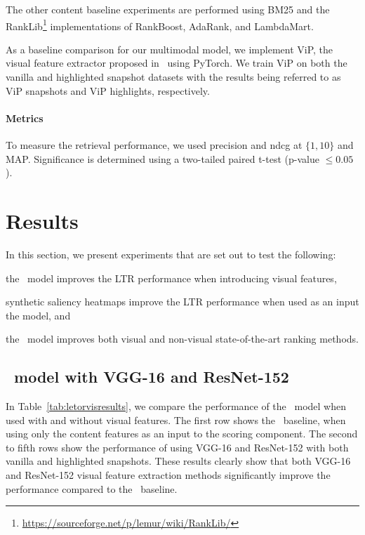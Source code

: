 The other content baseline experiments are performed using BM25 and the RankLib\footnote{\url{https://sourceforge.net/p/lemur/wiki/RankLib/}} implementations of RankBoost, AdaRank, and LambdaMart.

As a baseline comparison for our multimodal model, we implement ViP, the visual feature extractor proposed in~\citet{fan2017learning} using PyTorch. We train ViP on both the vanilla and highlighted snapshot datasets with the results being referred to as ViP snapshots and ViP highlights, respectively.


\paragraph{Metrics}
To measure the retrieval performance, we used precision and ndcg at $\{1,10\}$ and MAP.
Significance is determined using a two-tailed paired t-test (p-value $\leq 0.05$). 




\section{Results}
In this section, we present experiments that are set out to test the following:
\begin{inparaenum}[(i)]
    \item the \modelname~model improves the \ac{LTR} performance when introducing visual features, 
    \item synthetic saliency heatmaps improve the \ac{LTR} performance when used as an input the \modelname{} model, and
    \item the \modelname~model improves both visual and non-visual state-of-the-art ranking methods.
\end{inparaenum}

\subsection{\modelname~model with VGG-16 and ResNet-152}
In Table~\ref{tab:letorvisresults}, we compare the performance of the \modelname~model when used with and without visual features.
The first row shows the \modelname~baseline, when using only the content features as an input to the scoring component.
The second to fifth rows show the performance of using VGG-16 and ResNet-152 with both vanilla and highlighted snapshots. 
These results clearly show that both VGG-16 and ResNet-152 visual feature extraction methods significantly improve the performance compared to the \modelname~baseline. 


